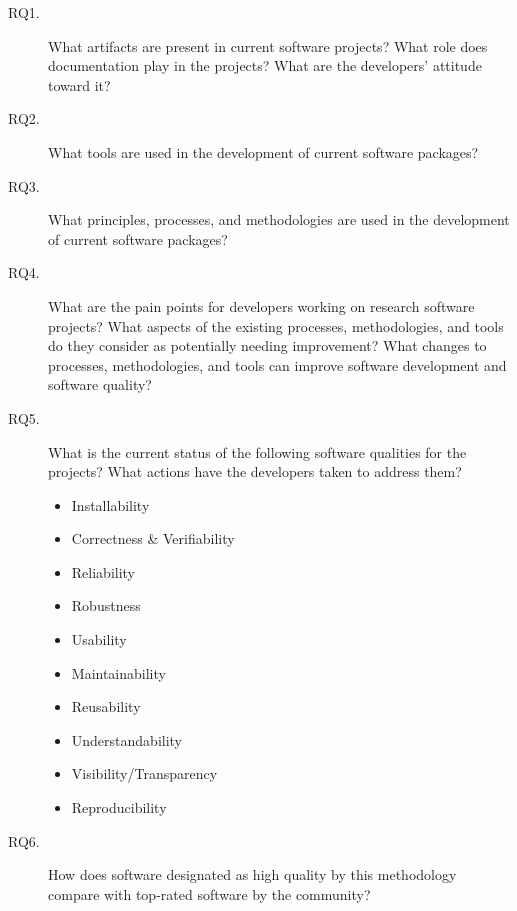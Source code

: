 \begin{description}
\item[RQ1.] What artifacts are present in current software projects? What role does documentation play in the projects? What are the developers' attitude toward it?
\item[RQ2.] What tools are used in the development of current software packages?
\item[RQ3.] What principles, processes, and methodologies are used in the development of current software packages?
\item[RQ4.] What are the pain points for developers working on research software projects? What aspects of the existing processes, methodologies, and tools do they consider as potentially needing improvement? What changes to processes, methodologies, and tools can improve software development and software quality?
\item[RQ5.] What is the current status of the following software qualities for the projects? What actions have the developers taken to address them?
\begin{itemize}
	\item Installability
	\item Correctness \& Verifiability
	\item Reliability
	\item Robustness
	\item Usability
	\item Maintainability
	\item Reusability
	\item Understandability
	\item Visibility/Transparency
	\item Reproducibility
\end{itemize}
\item[RQ6.] How does software designated as high quality by this methodology compare with top-rated software by the community?
\end{description}

